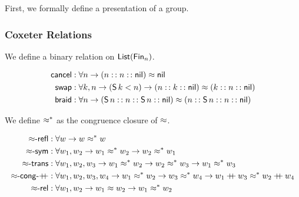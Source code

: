 

First, we formally define a presentation of a group.



\subsubsection{Coxeter Relations}

We define a binary relation on $\List[\Fin[n]]$.

\begin{definition}[$\cox$]
  \begin{align*}
    \cancel
     & : \forall n \to (n \cons n \cons \nil) \cox \nil                                                     \\
    \swap
     & : \forall k, n \to (\suc[k] < n) \to (n \cons k \cons \nil) \cox (k \cons n \cons \nil)              \\
    \braid
     & : \forall n \to (\suc[n] \cons n \cons \suc[n] \cons \nil) \cox (n \cons \suc[n] \cons n \cons \nil) \\
  \end{align*}
\end{definition}

We define $\cox*$ as the congruence closure of $\cox$.

\begin{definition}[$\cox*$]
  \begin{align*}
    \reflr{\cox}
     & : \forall w \to w \cox* w                                                                                                           \\
    \symr{\cox}
     & : \forall w_{1}, w_{2} \to w_{1} \cox* w_{2} \to w_{2} \cox* w_{1}                                                                  \\
    \transr{\cox}
     & : \forall w_{1}, w_{2}, w_{3} \to  w_{1} \cox* w_{2} \to w_{2} \cox* w_{3} \to w_{1} \cox* w_{3}                                    \\
    \congrf{\cox}{\append}
     & : \forall w_{1}, w_{2}, w_{3}, w_{4} \to  w_{1} \cox* w_{2} \to w_{3} \cox* w_{4} \to w_{1} \append w_{3} \cox* w_{2} \append w_{4} \\
    \relr{\cox}
     & : \forall w_{1}, w_{2} \to w_{1} \cox w_{2} \to w_{1} \cox* w_{2}                                                                   \\
  \end{align*}
\end{definition}

